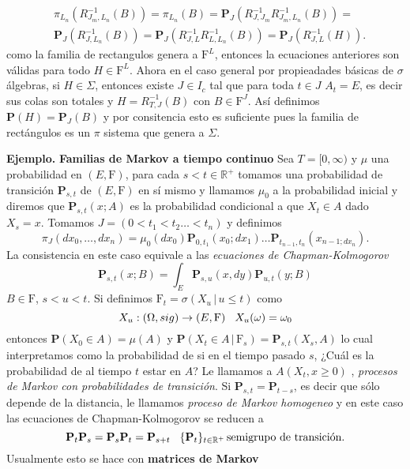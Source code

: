 \documentclass[letterpaper]{article}
\newcommand{\prob}{\textbf{P}}
\newcommand{\eje}{{\newline \noindent \sc \textbf{Ejemplo. }}}
\newcommand{\om}{\ensuremath{\Omega}}
\newcommand{\sig}{\ensuremath{\Sigma}}
\newcommand{\re}{\ensuremath{\mathbb R }}
\begin{document}
\begin{eqnarray}
    & \pi_{L_{n}}(R^{-1}_{J_{m},L_{n}}(B))=\pi_{L_{n}}(B)=\prob_J(R^{-1}_{J,J_{m}}R^{-1}_{J_{m},L_{n}}(B))=\\
    & \prob_{J}(R^{-1}_{J,L_{n}}(B))=\prob_{J}(R^{-1}_{J,L}R^{-1}_{L,L_{n}}(B))=\prob_{J}(R^{-1}_{J,L}(H)).
\end{eqnarray}
\noindent como la familia de rectangulos genera a \(\mathrm{F}^L\), entonces la ecuaciones anteriores son válidas para todo \(H\in\mathrm{F}^L\). Ahora en el caso general por propieadades básicas de \(\sigma\) álgebras, si \(H \in\sig\), entonces existe \(J\in I_c\) tal que para toda \(t\in J\) \(A_t=E\), es decir sus colas son totales y \(H=R^{-1}_{T,J}(B)\) con \(B\in\mathrm{F}^J\). Así definimos \(\prob(H)=\prob_J(B)\) y por consitencia esto es suficiente pues la familia de rectángulos es un \(\pi\) sistema que genera a \(\sig\).

\eje \textbf{Familias de Markov a tiempo continuo} Sea \(T=[0,\infty)\) y \(\mu\) una probabilidad en \((E,\mathrm{F})\), para cada \(s<t\in\re^{+}\) tomamos una probabilidad de transición \(\prob_{s,t}\) de \((E,\mathrm{F})\) en sí mismo y llamamos \(\mu_0\) a la probabilidad inicial y diremos que \(\prob_{s,t}(x;A)\) es la probabilidad condicional a que \(X_t\in A\) dado \(X_s=x\). Tomamos \(J=(0<t_1<t_2\dots<t_n)\) y definimos
\[
    \pi_J(dx_0,\dots,dx_n)=\mu_0(dx_0)\prob_{0,t_1}(x_0;dx_1)\dots\prob_{t_{n-1},t_n}(x_{n-1;dx_n}).
\]
La consistencia en este caso equivale a las \emph{ecuaciones de Chapman-Kolmogorov}
\[
    \prob_{s,t}(x;B)=\int_E\prob_{s,u}(x,dy)\prob_{u,t}(y;B)
\]
\noindent \(B\in\mathrm{F}\), \(s<u<t\). Si definimos \(\mathrm{F}_t=\sigma(X_u\,|\,u\leq t)\) como
\[
    X_u:(\om,sig)\rightarrow(E,\mathrm{F})\hspace{0.3cm}X_u(\omega)=\omega_0
\]
\noindent entonces \(\prob(X_0\in A)=\mu(A)\) y \(\prob(X_t\in A\,|\,\mathrm{F}_s)=\prob_{s,t}(X_s,A)\) lo cual interpretamos como la probabilidad de si en el tiempo pasado \(s\), ¿Cuál es la probabilidad de al tiempo \(t\) estar en \(A\)? Le llamamos a \(A(X_t,x\geq 0)\) , \emph{procesos de Markov con probabilidades de transición}. Si \(\prob_{s,t}=\prob_{t-s}\), es decir que sólo depende de la distancia, le llamamos \emph{proceso de Markov homogeneo} y en este caso las ecuaciones de Chapman-Kolmogorov se reducen a
\[
    \prob_t\prob_s=\prob_s\prob_t=\prob_{s+t}\hspace{0.3cm}\{\prob_t\}_{t\in\re^+}\,\text{semigrupo de transición}.
\]
Usualmente esto se hace con \textbf{matrices de Markov}
\end{document}
